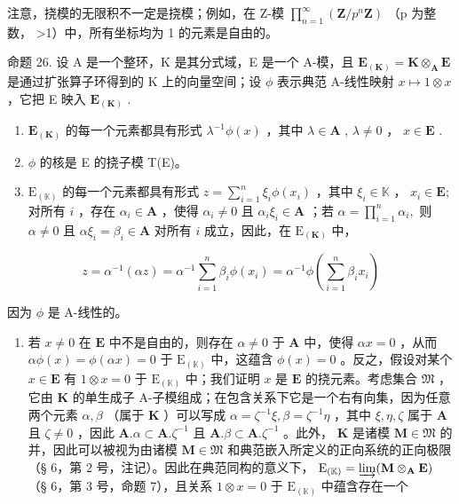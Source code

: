 注意，挠模的无限积不一定是挠模；例如，在 Z-模 \(\prod_{n=1}^{\infty}\left(\mathbf{Z}/p^{n}\mathbf{Z}\right)\) （p 为整数， \textgreater1）中，所有坐标均为 1 的元素是自由的。

命题 26. 设 A 是一个整环，K 是其分式域，E 是一个 A-模，且 \(\mathbf{E}_{(\mathbf{K})} = \mathbf{K} \otimes_{\mathbf{A}} \mathbf{E}\) 是通过扩张算子环得到的 K 上的向量空间；设 \(\phi\) 表示典范 A-线性映射 \(x \mapsto 1 \otimes x\) ，它把 E 映入 \(\mathbf{E}_{(\mathbf{K})}\) .

\begin{enumerate}
\def\labelenumi{(\roman{enumi})}
\item
  \(\mathbf{E}_{(\mathbf{K})}\) 的每一个元素都具有形式 \(\lambda^{-1}\phi(x)\) ，其中 \(\lambda \in \mathbf{A}\) , \(\lambda \neq 0\) ， \(x \in \mathbf{E}\) .
\item
  \(\phi\) 的核是 E 的挠子模 T(E)。
\item
  \(\mathrm{E}_{(\mathbb{K})}\) 的每一个元素都具有形式 \(z = \sum_{i=1}^{n} \xi_i \phi(x_i)\) ，其中 \(\xi_i \in \mathbb{K}\) ， \(x_{i}\in \mathbf{E};\) 对所有 \(i\) ，存在 \(\alpha_{i}\in \mathbf{A}\) ，使得 \(\alpha_{i}\neq 0\) 且 \(\alpha_{i}\xi_{i}\in \mathbf{A}\) ；若 \(\alpha = \prod_{i = 1}^{n}\alpha_{i},\) 则 \(\alpha \neq 0\) 且 \(\alpha \xi_{i} = \beta_{i}\in \mathbf{A}\) 对所有 \(i\) 成立，因此，在 \(\mathrm{E}_{(\mathbf{K})}\) 中，
\end{enumerate}

\[
z = \alpha^ {- 1} (\alpha z) = \alpha^ {- 1} \sum_ {i = 1} ^ {n} \beta_ {i} \phi (x _ {i}) = \alpha^ {- 1} \phi \left(\sum_ {i = 1} ^ {n} \beta_ {i} x _ {i}\right)
\]

因为 \(\phi\) 是 A-线性的。

\begin{enumerate}
\def\labelenumi{(\roman{enumi})}
\setcounter{enumi}{1}
\tightlist
\item
  若 \(x \neq 0\) 在 \(\mathbf{E}\) 中不是自由的，则存在 \(\alpha \neq 0\) 于 \(\mathbf{A}\) 中，使得 \(\alpha x = 0\) ，从而 \(\alpha \phi(x) = \phi(\alpha x) = 0\) 于 \(\mathrm{E}_{(\mathbb{K})}\) 中，这蕴含 \(\phi(x) = 0\) 。反之，假设对某个 \(x \in \mathbf{E}\) 有 \(1 \otimes x = 0\) 于 \(\mathrm{E}_{(\mathbb{K})}\) 中；我们证明 \(x\) 是 \(\mathbf{E}\) 的挠元素。考虑集合 \(\mathfrak{M}\) ，它由 \(\mathbf{K}\) 的单生成子 A-子模组成；在包含关系下它是一个右有向集，因为任意两个元素 \(\alpha, \beta\) （属于 \(\mathbf{K}\) ）可以写成 \(\alpha = \zeta^{-1}\xi, \beta = \zeta^{-1}\eta\) ，其中 \(\xi, \eta, \zeta\) 属于 \(\mathbf{A}\) 且 \(\zeta \neq 0\) ，因此 \(\mathbf{A}. \alpha \subset \mathbf{A}. \zeta^{-1}\) 且 \(\mathbf{A}. \beta \subset \mathbf{A}. \zeta^{-1}\) 。此外， \(\mathbf{K}\) 是诸模 \(\mathbf{M} \in \mathfrak{M}\) 的并，因此可以被视为由诸模 \(\mathbf{M} \in \mathfrak{M}\) 和典范嵌入所定义的正向系统的正向极限（§ 6，第 2 号，注记）。因此在典范同构的意义下， \(\mathrm{E}_{(\mathbb{K})} = \varinjlim (\mathbf{M} \otimes_{\mathbf{A}} \mathbf{E})\) （§ 6，第 3 号，命题 7），且关系 \(1 \otimes x = 0\) 于 \(\mathrm{E}_{(\mathbb{K})}\) 中蕴含存在一个
\end{enumerate}

